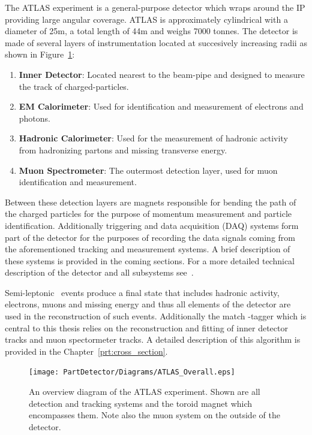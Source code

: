 The ATLAS\cite{Detector:ATLASExperimentGeneral} experiment is a general-purpose detector which wraps around the IP providing large angular coverage. ATLAS is approximately cylindrical with a diameter of 25m, a total length of 44m and weighs 7000 tonnes. The detector is made of several layers of instrumentation located at succesively increasing radii as shown in Figure~\ref{fig:ATLASOverviewFigure}:

\begin{enumerate}
  \item \textbf{Inner Detector}: Located nearest to the beam-pipe and designed to measure the track of charged-particles.
  \item \textbf{EM Calorimeter}: Used for identification and measurement of electrons and photons.
  \item \textbf{Hadronic Calorimeter}: Used for the measurement of hadronic activity from hadronizing partons and missing transverse energy.
  \item \textbf{Muon Spectrometer}: The outermost detection layer, used for muon identification and measurement.
\end{enumerate}

Between these detection layers are magnets responsible for bending the path of the charged particles for the purpose of momentum measurement and particle identification. Additionally triggering and data acquisition (DAQ) systems form part of the detector for the purposes of recording the data signals coming from the aforementioned tracking and measurement systems. A brief description of these systems is provided in the coming sections. For a more detailed technical description of the detector and all subsystems see~\cite{Detector:ATLAS_TDR_vol1}.

Semi-leptonic \ttbar\ events produce a final state that includes hadronic activity, electrons, muons and missing energy and thus all elements of the detector are used in the reconstruction of such events. Additionally the match \xsm-tagger which is central to this thesis relies on the reconstruction and fitting of inner detector tracks and muon spectormeter tracks. A detailed description of this algorithm is provided in the Chapter~\ref{prt:cross_section}. 

\begin{figure}[htbp]
  \centering
  \texttt{[image: PartDetector/Diagrams/ATLAS\_Overall.eps]}
  \caption{An overview diagram of the ATLAS experiment. Shown are all detection and tracking systems and the toroid magnet which encompasses them. Note also the muon system on the outside of the detector.}
  \label{fig:ATLASOverviewFigure}
\end{figure}

